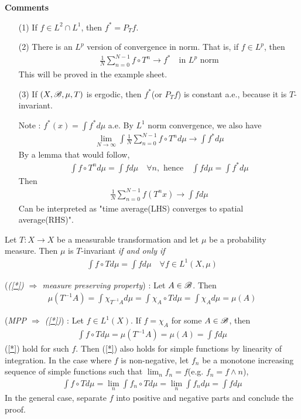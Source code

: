 \documentclass[10pt,a4paper]{report}
\newenvironment{proof}
{\begin{changemargin}{1cm}{0.5cm} 
	}%
	{\end{changemargin}
}
\begin{document}
\textbf{Comments}
\begin{itemize}
\item[(1)] If $f\in L^2 \cap L^1$, then $f^* = P_T f$.
\item[(2)] There is an $L^p$ version of convergence in norm. That is, if $f\in L^p$, then
\begin{align*}
\frac{1}{N} \sum_{n=0}^{N-1} f\circ T^n \rightarrow f^* \quad \text{in } L^p \text{ norm}
\end{align*}
This will be proved in the example sheet.
\item[(3)] If $(X,\mathscr{B}, \mu, T)$ is ergodic, then $f^*$(or $P_T f$) is constant a.e., because it is $T$-invariant.

\quad Note : $f^*(x)  = \int f^* d\mu$ a.e. By $L^1$ norm convergence, we also have
\begin{align*}
\lim_{N\rightarrow \infty} \int \frac{1}{N} \sum_{n=0}^{N-1} f\circ T^n d\mu \rightarrow \int f^* d\mu
\end{align*}
By a lemma that would follow,
\begin{align*}
\int f\circ T^n d\mu = \int fd\mu \quad \forall n, \text{ hence} \quad \int f d\mu = \int f^* d\mu
\end{align*}
Then
\begin{align*}
\frac{1}{N} \sum_{n=0}^{N-1}f(T^n x) \rightarrow \int f d\mu
\end{align*}
Can be interpreted as "time average(LHS) converges to spatial average(RHS)".
\end{itemize}
\s

\lem Let $T : X \rightarrow X$ be a measurable transformation and let $\mu$ be a probability measure. Then $\mu$ is $T$-invariant \emph{if and only if}
\begin{align}
\int f\circ T d \mu = \int f d\mu \quad \forall f \in L^1(X,\mu)  \label{*}
\end{align}
\begin{proof}
\pf  (\emph{(\ref{*}) $\Rightarrow$ measure preserving property}) : Let $A\in \mathscr{B}$. Then
\begin{align*}
\mu(T^{-1} A) = \int \chi_{T^{-1} A} d\mu = \int \chi_A \circ T d\mu = \int \chi_A d\mu = \mu(A)
\end{align*}

(\emph{MPP $\Rightarrow$ (\ref{*})}) : Let $f\in L^1(X)$. If $f= \chi_A$ for some $A\in \mathscr{B}$, then
\begin{align*}
\int f \circ T d\mu = \mu(T^{-1}A) = \mu (A)  = \int f d\mu
\end{align*}
(\ref{*}) hold for such $f$. Then (\ref{*}) also holds for simple functions by linearity of integration. In the case where $f$ is non-negative, let $f_n$ be a monotone increasing sequence of simple functions such that $\lim_n f_n = f$(e.g. $f_n = f\wedge n$),
\begin{align*}
\int f\circ T d\mu = \lim_n \int f_n \circ T d\mu = \lim_n \int f_n d\mu = \int fd\mu
\end{align*}
\quad In the general case, separate $f$ into positive and negative parts and conclude the proof.

\eop
\end{proof}
\s
\end{document}
